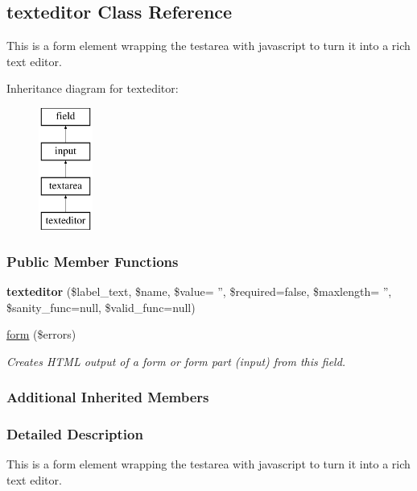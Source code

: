 \hypertarget{classtexteditor}{\subsection{texteditor Class Reference}
\label{classtexteditor}
}


This is a form element wrapping the testarea with javascript to turn it into a rich text editor.  


Inheritance diagram for texteditor\-:\begin{figure}[H]
\begin{center}
\leavevmode
\includegraphics[height=4.000000cm]{classtexteditor}
\end{center}
\end{figure}
\subsubsection*{Public Member Functions}
\begin{DoxyCompactItemize}
\item 
\hypertarget{classtexteditor_a6ecfa4454b5b96286732f0f503e6485b}{{\bfseries texteditor} (\$label\-\_\-text, \$name, \$value= '', \$required=false, \$maxlength= '', \$sanity\-\_\-func=null, \$valid\-\_\-func=null)}\label{classtexteditor_a6ecfa4454b5b96286732f0f503e6485b}

\item 
\hyperlink{classtexteditor_a129b929db008ec11f4a683f542787c74}{form} (\$errors)
\begin{DoxyCompactList}\small\item\em Creates H\-T\-M\-L output of a form or form part (input) from this field. \end{DoxyCompactList}\end{DoxyCompactItemize}
\subsubsection*{Additional Inherited Members}


\subsubsection{Detailed Description}
This is a form element wrapping the testarea with javascript to turn it into a rich text editor. 

